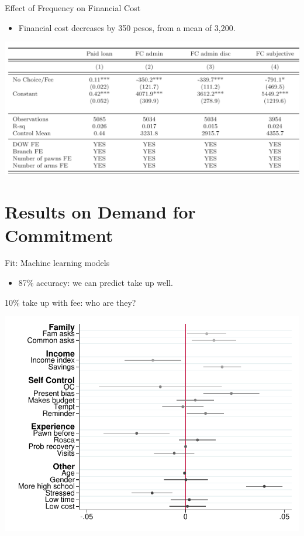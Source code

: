 \documentclass[9pt]{beamer}
\begin{document}
\begin{frame}{Effect of Frequency on Financial Cost}

\begin{itemize}
    \item Financial cost decreases by 350 pesos, from a mean of 3,200.
\end{itemize}
\vspace{.2in}
\vfill
    \begin{center}
        \includegraphics[width=.9\textwidth]{Figuras/FC_table.png}
    \end{center}
\end{frame}




\section{Results on Demand for Commitment}


\begin{frame}{Fit: Machine learning models}
\begin{itemize}
    \item 87\% accuracy: we can predict take up well.
    \vfill
\end{itemize}
    \begin{center}
    
    \end{center}
\end{frame}



\begin{frame}{10\% take up with fee: who are they?}
    \begin{center}
        \includegraphics[width=.90\textwidth]{Figuras/pago_frec_vol_fee_interactions_rf.pdf}
    \end{center}
\end{frame}
\end{document}
